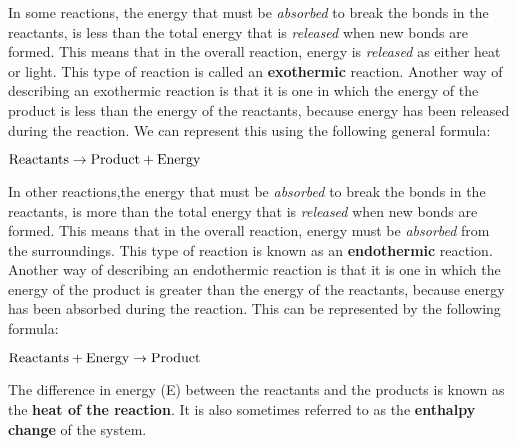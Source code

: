 In some reactions, the energy that must be \textit{absorbed} to break the bonds in the reactants, is less than
the total energy that is \textit{released} when new bonds are formed. This means that in the overall reaction, energy is \textit{released} as either heat or light. This type of reaction is called an \textbf{exothermic} reaction. Another way of describing an exothermic reaction is that it is one in which the energy of the product is less than the energy of the reactants, because energy has been released during the reaction. We can represent this using the following general formula:

\begin{center}
$\rm{Reactants \rightarrow Product + Energy}$
\end{center}


In other reactions,the energy that must be \textit{absorbed} to break the bonds in the reactants, is more than
the total energy that is \textit{released} when new bonds are formed. This means that in the overall reaction, energy must be \textit{absorbed} from the surroundings. This type of reaction is known as an \textbf{endothermic} reaction. Another way of describing an endothermic reaction is that it is one in which the energy of the product is greater than the energy of the reactants, because energy has been absorbed during the reaction. This can be represented by the following formula:

\begin{center}
$\rm{Reactants + Energy \rightarrow Product}$
\end{center}


The difference in energy (E) between the reactants and the products is known as the \textbf{heat of the reaction}. It is also sometimes referred to as the \textbf{enthalpy change} of the system.

